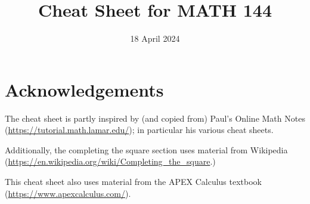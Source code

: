 \documentclass[9pt]{extarticle}
\title{Cheat Sheet for MATH 144}
\date{18 April 2024}
\theoremstyle{definition}
\theoremstyle{remark}
\begin{document}
	
	\pagebreak
	\begin{multicols}{2} \raggedcolumns \setcounter{unbalance}{10}
		
		
		
	\end{multicols}

	\section{Acknowledgements}
	The cheat sheet is partly inspired by (and copied from) Paul's Online Math Notes (\url{https://tutorial.math.lamar.edu/}); in particular his various cheat sheets.

	Additionally, the completing the square section uses material from Wikipedia (\url{https://en.wikipedia.org/wiki/Completing_the_square}.)

	This cheat sheet also uses material from the APEX Calculus textbook (\url{https://www.apexcalculus.com/}).
\end{document}
